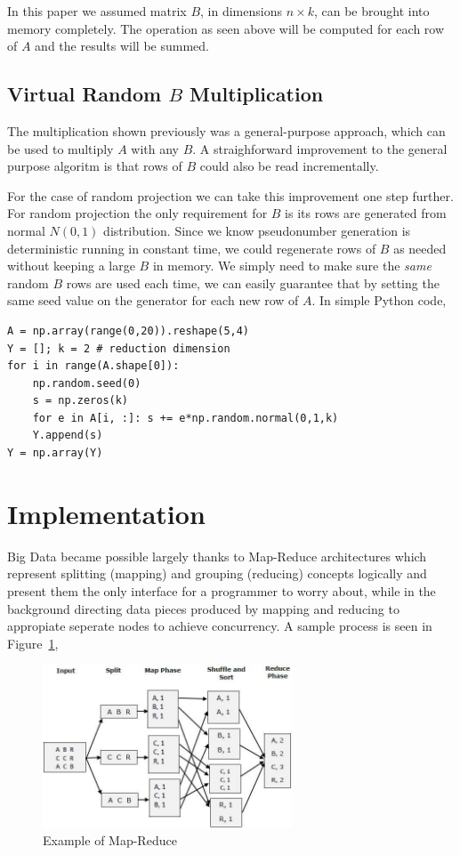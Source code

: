 \documentclass{article}
\begin{document}
In this paper we assumed matrix $B$, in dimensions $n \times k$, can be brought
into memory completely. The operation as seen above will be computed for each
row of $A$ and the results will be summed.

\subsection{Virtual Random $B$ Multiplication}

The multiplication shown previously was a general-purpose approach, which can be
used to multiply $A$ with any $B$. A straighforward improvement to the general
purpose algoritm is that rows of $B$ could also be read incrementally.

For the case of random projection we can take this improvement one step
further. For random projection the only requirement for $B$ is its rows are
generated from normal $N(0,1)$ distribution. Since we know pseudonumber
generation is deterministic running in constant time, we could regenerate rows
of $B$ as needed without keeping a large $B$ in memory. We simply need to make
sure the {\em same} random $B$ rows are used each time, we can easily guarantee
that by setting the same seed value on the generator for each new row of $A$. In
simple Python code,

\begin{verbatim}
A = np.array(range(0,20)).reshape(5,4)
Y = []; k = 2 # reduction dimension
for i in range(A.shape[0]):
    np.random.seed(0)
    s = np.zeros(k)
    for e in A[i, :]: s += e*np.random.normal(0,1,k)
    Y.append(s)
Y = np.array(Y)
\end{verbatim}

\section{Implementation}

Big Data became possible largely thanks to Map-Reduce architectures which
represent splitting (mapping) and grouping (reducing) concepts logically and
present them the only interface for a programmer to worry about, while in the
background directing data pieces produced by mapping and reducing to appropiate
seperate nodes to achieve concurrency. A sample process is seen in
Figure~\ref{fig:mapreduce1},

\begin{figure}[h]
  \centering
  \includegraphics[width=20em]{mapreduce1.jpg}
  \caption{Example of Map-Reduce}
  \label{fig:mapreduce1}
\end{figure}
\end{document}
